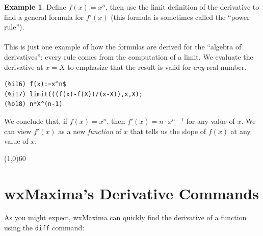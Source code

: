 \documentclass[10.5pt,twoside]{report}
\theoremstyle{definition}
\newtheorem{exmp}{Example}[section]
\begin{document}
\begin{exmp} Define $f(x)=x^n$, then use the limit definition of the derivative to find a general formula for $f'(x)$ (this formula is sometimes called the ``power rule'').\\
${}$\\

This is just one example of how the formulas are derived for the ``algebra of derivatives'':  every rule comes from the computation of a limit.  We evaluate the derivative at $x=X$ to emphasize that the result is valid for \textit{any} real number.

\begin{verbatim}
(%i16) f(x):=x^n$
(%i17) limit(((f(x)-f(X))/(x-X)),x,X);
(%o18) n*X^(n-1)
\end{verbatim}

We conclude that, if $f(x)=x^n$, then $f'(x)=n\cdot x^{n-1}$ for any value of $x$.  We can view $f'(x)$ as a new \textit{function} of $x$ that tells us the slope of $f(x)$ at any value of $x$.

\end{exmp}

\line(1,0){60}
\linethickness{0.5mm}

\pagebreak

\section{wxMaxima's Derivative Commands}\label{wxMaxima's Derivative Commands}

As you might expect, wxMaxima can quickly find the derivative of a function using the \verb|diff| command:
\end{document}
